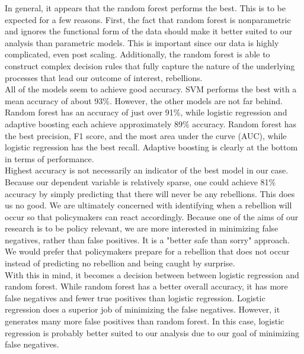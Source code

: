 \documentclass[12pt, letterpaper]{article}
\begin{document}

In general, it appears that the random forest performs the best. This is to be expected for a few reasons. First, the fact that random forest is 
nonparametric and ignores the functional form of the data should make it better suited to our analysis than parametric models. This is important 
since our data is highly complicated, even post scaling. Additionally, the random forest is able to construct complex decision rules that
fully capture the nature of the underlying processes that lead our outcome of interest, rebellions.\\

All of the models seem to achieve good accuracy. SVM performs the best with a mean accuracy of about 93\%. However, the other models are not far 
behind. Random forest has an accuracy of just over 91\%, while logistic regression and adaptive boosting each achieve approximately 89\% accuracy. 
Random forest has the best precision, F1 score, and the most area under the curve (AUC), while logistic regression has the best recall. Adaptive 
boosting is clearly at the bottom in terms of performance.\\

Highest accuracy is not necessarily an indicator of the best model in our case. Because our dependent variable is relatively sparse, one could 
achieve 81\% accuracy by simply predicting that there will never be any rebellions. This does us no good. We are ultimately concerned with 
identifying when a rebellion will occur so that policymakers can react accordingly. Because one of the aims of our research is to be policy 
relevant, we are more interested in minimizing false negatives, rather than false positives. It is a "better safe than sorry" approach. We would 
prefer that policymakers prepare for a rebellion that does not occur instead of predicting no rebellion and being caught by surprise.\\ 

With this in mind, it becomes a decision between between logistic regression and random forest. While random forest has a better overall accuracy, 
it has more false negatives and fewer true positives than logistic regression. Logistic regression does a superior job of minimizing the false 
negatives. However, it generates many more false positives than random forest. In this case, logistic regression is probably better suited to our 
analysis due to our goal of minimizing false negatives. \\
\end{document}
